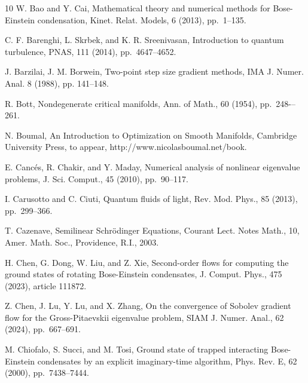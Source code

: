 \documentclass[preprint,3p]{elsarticle}
\begin{document}
\begin{thebibliography}{10}
	{ W. Bao and Y. Cai}, { Mathematical theory and numerical methods
		for Bose-Einstein condensation}, Kinet. Relat. Models, 6 (2013), pp.~1--135.
	
	{ C. F. Barenghi, L. Skrbek, and K. R. Sreenivasan}, { Introduction to quantum turbulence}, PNAS, 111 (2014), pp.~4647--4652.
	
	J. Barzilai, J. M. Borwein, Two-point step size gradient methods, IMA J. Numer. Anal. 8 (1988), pp. 141--148.
	
	{ R. Bott}, { Nondegenerate critical manifolds}, Ann. of Math., 60 (1954), pp.~248-–261.
	
	{ N. Boumal}, { An Introduction to Optimization on Smooth Manifolds}, Cambridge University Press, to appear, http://www.nicolasboumal.net/book.
	
	
	{ E. Canc\'es, R. Chakir, and Y. Maday}, { Numerical analysis of nonlinear eigenvalue problems}, J. Sci. Comput., 45 (2010), pp.~90--117.
	
	
	{ I. Carusotto and C. Ciuti}, { Quantum fluids of light}, Rev. Mod. Phys., 85 (2013), pp.~299--366.
	
	{ T. Cazenave}, { Semilinear Schr\"odinger Equations}, Courant Lect. Notes Math., 10, Amer. Math. Soc., Providence, R.I., 2003.
	
	{ H. Chen, G. Dong, W. Liu, and Z. Xie}, { Second-order flows for
		computing the ground states of rotating {B}ose-{E}instein condensates},
	J. Comput. Phys., 475 (2023), article 111872.
	
	{ Z. Chen, J. Lu, Y. Lu, and X. Zhang}, { On the convergence of Sobolev gradient flow for the Gross-Pitaevskii eigenvalue problem}, SIAM J. Numer. Anal., 62 (2024), pp.~667--691.
	
	{ M. Chiofalo, S. Succi, and M. Tosi}, { Ground state of trapped interacting
		{B}ose-{E}instein condensates by an explicit imaginary-time algorithm},
	Phys. Rev. E, 62 (2000), pp.~7438--7444.
	

\end{thebibliography}
\end{document}
